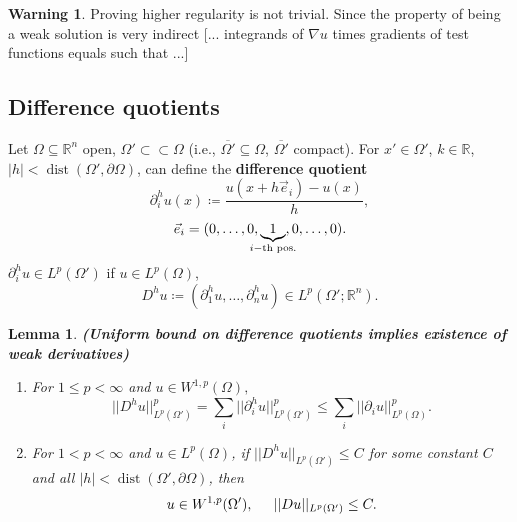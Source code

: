 \documentclass[12pt]{article}
\DeclareMathOperator{\dist}{dist}
\newtheorem{lemma}{Lemma}[section]
\theoremstyle{definition}
\newtheorem*{warning}{Warning}
\begin{document}
\begin{warning}
Proving higher regularity is not trivial. Since the property of being a weak solution is very indirect [... integrands of $\nabla u$ times gradients of test functions equals such that ...]
\end{warning}

\subsection{Difference quotients}
Let $\Omega\subseteq\mathbb R^n$ open, $\Omega'\subset\subset\Omega$ (i.e., $\overline{\Omega'}\subseteq\Omega$, $\overline{\Omega'}$ compact). For $x'\in\Omega'$, $k\in\mathbb R$, $|h|<\dist(\Omega',\partial\Omega)$, can define the \textbf{difference quotient}
\[\partial_i^hu(x)\coloneqq\frac{u(x+h\vec e_i)-u(x)}h,\]
\[\vec e_i=(0,\ldots,0,\underbrace{1}_{\mathclap{i-\text{th pos.}}},0,\ldots,0).\]
$\partial_i^hu\in L^p(\Omega')$ if $u\in L^p(\Omega)$,
\[D^hu\coloneqq(\partial_1^hu,\ldots,\partial_n^hu)\in L^p(\Omega';\mathbb R^n).\]

\begin{lemma}\label{uniform_bound}
\emph{\textbf{(Uniform bound on difference quotients implies existence of weak derivatives)}}
\begin{enumerate}[label=(\roman*)]
\item\label{uniform_bound_difference} For $1\leq p<\infty$ and $u\in W^{1,p}(\Omega),$
\[||D^hu||_{L^p(\Omega')}^p=\sum_i||\partial_i^hu||_{L^p(\Omega')}^p\leq\sum_i||\partial_iu||_{L^p(\Omega)}^p.\]

\item\label{uniform_bound_differential} For $1<p<\infty$ and $u\in L^p(\Omega)$, if $||D^hu||_{L^p(\Omega')}\leq C$ for some constant $C$ and all $|h|<\dist(\Omega',\partial\Omega)$, then
\[u\in W^{1,p}(\Omega'),\hspace{5mm}||Du||_{L^p(\Omega')}\leq C.\]
\end{enumerate}
\end{lemma}
\end{document}
